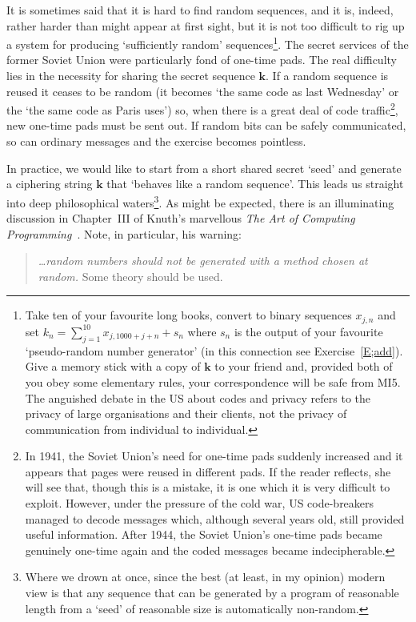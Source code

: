 \documentclass[12pt,a4paper]{article}
\theoremstyle{plain}
\theoremstyle{definition}
\begin{document}
    It is sometimes said that it is hard to find
    random sequences, and it is, indeed, rather harder
    than might appear at first sight, but it is
    not too difficult to rig up a system for producing
    `sufficiently random' sequences\footnote{Take ten
    of your favourite long books, convert to
    binary sequences $x_{j,n}$ and set
    $k_{n}=\sum_{j=1}^{10}x_{j,1000+j+n}+s_{n}$
    where $s_{n}$ is the output of your favourite
    `pseudo-random number generator'
    (in this connection see Exercise~\ref{E;add}). Give a memory stick
    with a copy of ${\mathbf k}$ to your friend
    and, provided both of you obey some elementary rules,
    your correspondence
    will be safe from MI5. The anguished debate in the US
    about codes and
    privacy refers to the privacy of large organisations
    and their clients, not the privacy of communication
    from individual to individual.}.
    The secret
    services of the former Soviet Union were
    particularly fond of one-time
    pads.
    The real
    difficulty lies in the necessity for sharing
    the secret sequence ${\mathbf k}$. If a random sequence
    is reused it ceases to be random (it becomes
    `the same code as last Wednesday' or the
    `the same code as Paris uses') so, when
    there is a great deal of code traffic\footnote{In 1941,
    the Soviet Union's
    need for one-time pads suddenly
    increased and it appears that pages were reused
    in different pads. If the reader reflects, she will see that,
    though this is a mistake,
    it is one which it is very difficult to exploit.
    However, under the pressure of the cold war, US code-breakers
    managed to decode messages which, although several years old,
    still provided useful information. After 1944, the Soviet Union's
    one-time pads became genuinely one-time again and the
    coded messages became indecipherable.}, new
    one-time pads must be sent out.
    If random bits can be safely communicated,
    so can ordinary messages and the exercise
    becomes pointless.

    In practice, we would like to start from a short
    shared secret `seed' and generate a ciphering
    string ${\mathbf k}$ that `behaves like a random
    sequence'. This leads us straight into deep
    philosophical waters\footnote{Where we drown
    at once, since the best (at least, in
    my opinion)
    modern view is that any sequence that can be generated
    by a program of reasonable length from a `seed'
    of reasonable size is automatically non-random.}.
    As might be expected, there is an illuminating
    discussion in Chapter~III
    of Knuth's marvellous \emph{The Art of
    Computing Programming}~\cite{Knuth}.
    Note, in particular, his warning:
    \begin{quote}
        \emph{\dots random numbers
        should not be generated with a method chosen at
        random.} Some theory should be used.
    \end{quote}
\end{document}
